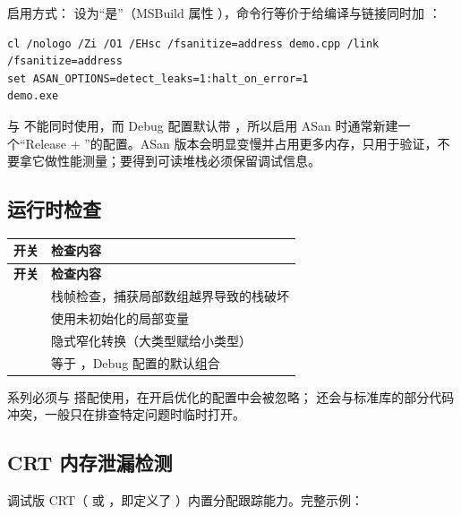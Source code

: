 启用方式： 设为“是”（MSBuild 属性 ），命令行等价于给编译与链接同时加 ：

\begin{lstlisting}[style=shellstyle]
cl /nologo /Zi /O1 /EHsc /fsanitize=address demo.cpp /link /fsanitize=address
set ASAN_OPTIONS=detect_leaks=1:halt_on_error=1
demo.exe
\end{lstlisting}

\begin{warnbox}[注意]
 与  不能同时使用，而 Debug 配置默认带 ，所以启用 ASan 时通常新建一个“Release + ”的配置。ASan 版本会明显变慢并占用更多内存，只用于验证，不要拿它做性能测量；要得到可读堆栈必须保留调试信息。
\end{warnbox}

\subsection{ 运行时检查}
\begin{longtable}{L{2.4cm}L{12.6cm}}
\toprule \textbf{开关} & \textbf{检查内容} \\ \midrule
\endfirsthead
\toprule \textbf{开关} & \textbf{检查内容} \\ \midrule
\endhead
\bottomrule \endlastfoot
{} & 栈帧检查，捕获局部数组越界导致的栈破坏 \\
 & 使用未初始化的局部变量 \\
 & 隐式窄化转换（大类型赋给小类型） \\
 & 等于 ，Debug 配置的默认组合 \\
\end{longtable}

 系列必须与  搭配使用，在开启优化的配置中会被忽略； 还会与标准库的部分代码冲突，一般只在排查特定问题时临时打开。

\subsection{CRT 内存泄漏检测}
调试版 CRT（ 或 ，即定义了 ）内置分配跟踪能力。完整示例：

